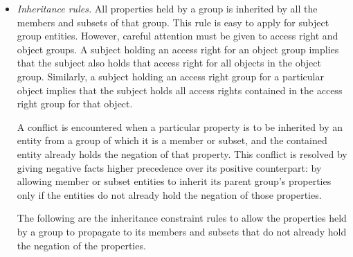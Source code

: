 \documentclass[global,twocolumn,final]{svjour}
\newenvironment{vquote}
  {\begin{list}{}{\leftmargin 1em}\item[]}
  {\end{list}}
\begin{document}
          \begin{itemize}
            \item
              {\em Inheritance rules.}
              All properties held by a group is inherited by all the members
              and subsets of that group. This rule is easy to apply for subject
              group entities. However, careful attention must be given to access
              right and object groups. A subject holding an access right for an
              object group implies that the subject also holds that access
              right for all objects in the object group. Similarly, a subject
              holding an access right group for a particular object implies
              that the subject holds all access rights contained in the access
              right group for that object.

              A conflict is encountered when a particular property is to be
              inherited by an entity from a group of which it is a member or
              subset, and the contained entity already holds the negation of
              that property. This conflict is resolved by giving negative facts
              higher precedence over its positive counterpart: by allowing
              member or subset entities to inherit its parent group's
              properties only if the entities do not already hold the negation
              of those properties.

              The following are the inheritance constraint rules to allow the
              properties held by a group to propagate to its members and
              subsets that do not already hold the negation of the properties.

\end{itemize}
\end{document}
